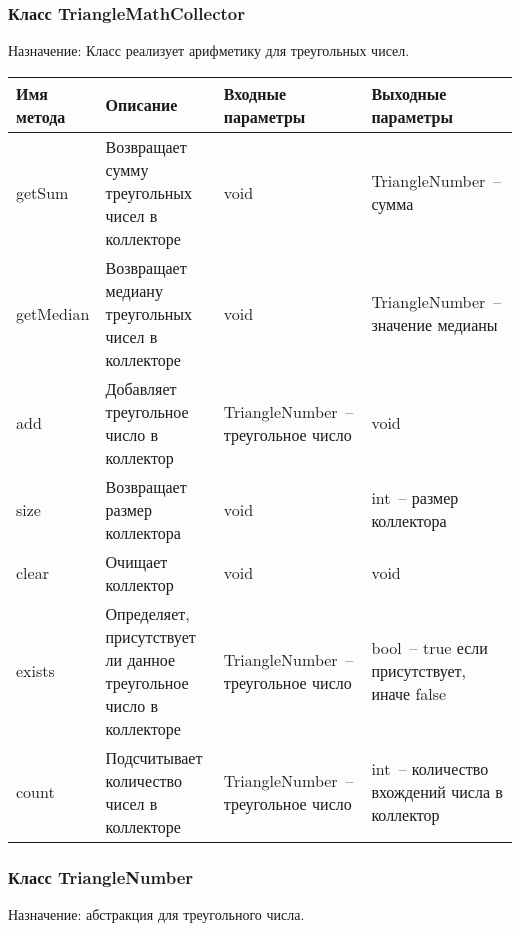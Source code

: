\documentclass[a4paper,14pt,russian]{extreport}
\begin{document}
\subsubsection{Класс TriangleMathCollector}

Назначение: Класс реализует арифметику для треугольных чисел.

\begin{longtable}{|m{3 cm}|m{3 cm}|m{4 cm}|m{4 cm}|}
\hline
Имя метода & Описание & Входные параметры & Выходные параметры \\
\hline
getSum & Возвращает сумму треугольных чисел в коллекторе & void & {Triangle\-Number}~-- сумма \\
\hline
{get\-Median} & Возвращает медиану треугольных чисел в коллекторе & void & {Triangle\-Number}~-- значение медианы \\
\hline
add & Добавляет треугольное число в коллектор & {Triangle\-Number}~--треугольное число & void \\
\hline
size & Возвращает размер коллектора & void & int~-- размер коллектора \\
\hline
clear & Очищает коллектор & void & void \\
\hline
exists & Определяет, присутствует ли данное треугольное число в коллекторе & {Triangle\-Number}~--треугольное число & bool~-- true если присутствует, иначе false \\
\hline
count & Подсчитывает количество чисел в коллекторе & {Triangle\-Number}~--треугольное число & int~-- количество вхождений числа в коллектор \\
\hline
\end{longtable}

\subsubsection{Класс TriangleNumber}

Назначение: абстракция для треугольного числа.
\end{document}

